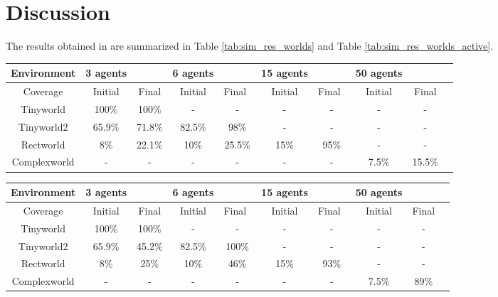 \section{Discussion}
The results obtained in  are summarized in Table \ref{tab:sim_res_worlds} and Table \ref{tab:sim_res_worlds_active}.
\begin{center}
  \begin{tabular}{c|cc|cc|cc|ccc}
    Environment & 3 agents & & 6 agents & & 15 agents & & 50 agents\\
    \hline
    Coverage & Initial & Final & Initial & Final\ & Initial & Final\ & Initial & Final\\
    \hline
    Tinyworld   & 100\% & 100\% & - & - & - & - & - & - \\
    Tinyworld2  & 65.9\% & 71.8\% & 82.5\% & 98\% & - & - & - & - \\
    Rectworld   & 8\% & 22.1\%& 10\% & 25.5\% & 15\% & 95\% & - & - \\
    Complexworld& - & - & - & - & - & - & 7.5\% & 15.5\% \\
\end{tabular}
\end{center}

\begin{center}
  \begin{tabular}{c|cc|cc|cc|ccc}
    Environment & 3 agents & & 6 agents & & 15 agents & & 50 agents\\
    \hline
    Coverage & Initial & Final & Initial & Final\ & Initial & Final\ & Initial & Final\\
    \hline
    Tinyworld   & 100\% & 100\% & - & - & - & - & - & - \\
    Tinyworld2  & 65.9\% & 45.2\% & 82.5\% & 100\% & - & - & - & - \\
    Rectworld   & 8\% & 25\%& 10\% & 46\% & 15\% & 93\% & - & - \\
    Complexworld& - & - & - & - & - & - & 7.5\% & 89\% \\
\end{tabular}
\end{center}
